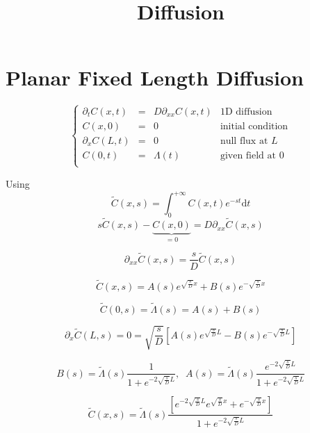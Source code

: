 \documentclass[aps,12pt]{revtex4}
\begin{document}
\title{Diffusion}
\maketitle
	
\section{Planar Fixed Length Diffusion}

\begin{equation}
\left\lbrace
\begin{array}{rcl|l}
	\partial_t C(x,t) & = & D \partial_{xx} C(x,t) & \text{1D diffusion}\\
	C(x,0) & = & 0 & \text{initial condition}\\
	\partial_x C(L,t) & = & 0 & \text{null flux at } L \\
	C(0,t) & = & \Lambda(t) & \text{given field at } 0\\
\end{array}
\right.
\end{equation} 

Using 
\begin{equation}
	\tilde{C}(x,s) = \int_0^{+\infty} C(x,t) e^{-st} \mathrm{d}t
\end{equation} 
 \begin{equation}
	s\tilde{C}(x,s) - \underbrace{C(x,0)}_{=0} = D \partial_{xx} \tilde{C}(x,s)
\end{equation}
 
\begin{equation}
	\partial_{xx} \tilde{C}(x,s) = \dfrac{s}{D} \tilde{C}(x,s)
\end{equation}
 
\begin{equation}
	\tilde{C}(x,s) = A(s) e^{\sqrt{\frac{s}{D}} x} + B(s)  e^{-\sqrt{\frac{s}{D}} x}
\end{equation}
 
\begin{equation}
	\tilde{C}(0,s) = \tilde{\Lambda}(s) = A(s) + B(s)
\end{equation}

\begin{equation}
	\partial_x\tilde{C}(L,s) = 0 = \sqrt{\frac{s}{D}} \left[ A(s) e^{\sqrt{\frac{s}{D}} L}  - B(s) e^{-\sqrt{\frac{s}{D}} L} \right]
\end{equation}

\begin{equation}
	B(s) = \tilde{\Lambda}(s)\dfrac{1}{1+e^{-2\sqrt{\frac{s}{D}} L}}, \;\;A(s) = \tilde{\Lambda}(s)\dfrac{e^{-2\sqrt{\frac{s}{D}} L}}{1+e^{-2\sqrt{\frac{s}{D}} L}}
\end{equation}

\begin{equation}
	\tilde{C}(x,s) = \tilde{\Lambda}(s) \dfrac{\left[  e^{-2\sqrt{\frac{s}{D}} L} e^{\sqrt{\frac{s}{D}} x} +   e^{-\sqrt{\frac{s}{D}} x} \right]}
	{1+e^{-2\sqrt{\frac{s}{D}} L}}
\end{equation}
\end{document}
